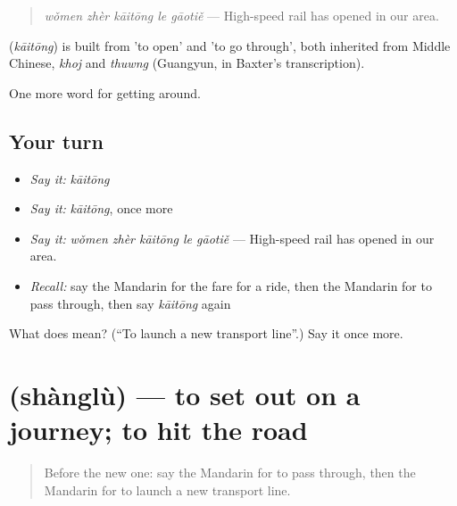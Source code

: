 \begin{quote}
\emph{wǒmen zhèr kāitōng le gāotiě} — High-speed rail has opened in our area.
\end{quote}

\begin{cousinweb}
\textbf{} (\emph{kāitōng}) is built from  'to open' and  'to go through', both inherited from Middle Chinese, \emph{khoj} and \emph{thuwng} (Guangyun, in Baxter's transcription).
\end{cousinweb}

\begin{grammarlens}[title={What you've built}]
One more word for getting around.
\end{grammarlens}

\subsection*{Your turn}
\begin{itemize}
\raggedright
  \item \emph{Say it:} \emph{kāitōng}
  \item \emph{Say it:} \emph{kāitōng}, once more
  \item \emph{Say it:} \emph{wǒmen zhèr kāitōng le gāotiě} — High-speed rail has opened in our area.
  \item \emph{Recall:} say the Mandarin for the fare for a ride, then the Mandarin for to pass through, then say \emph{kāitōng} again
\end{itemize}

\begin{tcolorbox}[breakable,colback=teal!4,colframe=teal!35!black,title={Before you move on}]
What does  mean? (\textquotedblleft{}To launch a new transport line\textquotedblright{}.) Say it once more.
\end{tcolorbox}
\section[\texorpdfstring{\zh{上路} (shànglù)}{上路 (shànglù)}]{ (shànglù) — to set out on a journey; to hit the road}

\label{lesson:ZH-C410-shanglu}



\begin{quote}
Before the new one: say the Mandarin for to pass through, then the Mandarin for to launch a new transport line.
\end{quote}

